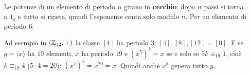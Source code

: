 \begin{spiegazione}
    Le potenze di un elemento di periodo $n$ girano in \textbf{cerchio}: dopo $n$ passi si torna a $1_g$ e tutto si ripete, quindi
    l'esponente conta solo modulo $n$. Per un elemento di periodo $6$:
    \begin{center}
    \end{center}
    Ad esempio in $(\mathbb{Z}_{12}, +)$ la classe $[4]$ ha periodo $3$: $[4], [8], [12] = [0]$. E se $g = \langle x \rangle$ ha $19$ elementi, $x$ ha periodo $19$ e
    $(x^5)^k = x$ se e solo se $5k \equiv_{19} 1$, cioè $k \equiv_{19} 4$ ($5 \cdot 4 = 20$): $(x^5)^4 = x^{20} = x$. Quindi anche $x^5$ genera tutto $g$.
\end{spiegazione}
